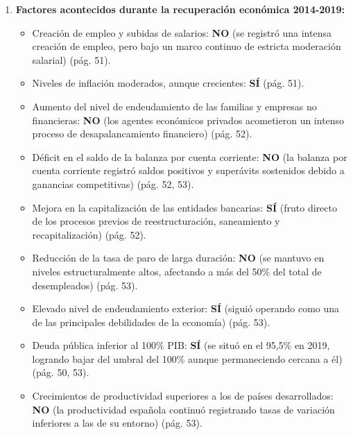 \begin{enumerate}[label=\arabic*.]
    \item \textbf{Factores acontecidos durante la recuperación económica 2014-2019:}
    \begin{itemize}
        \item Creación de empleo y subidas de salarios: \textbf{NO} (se registró una intensa creación de empleo, pero bajo un marco continuo de estricta moderación salarial) (pág. 51).
        \item Niveles de inflación moderados, aunque crecientes: \textbf{SÍ} (pág. 51).
        \item Aumento del nivel de endeudamiento de las familias y empresas no financieras: \textbf{NO} (los agentes económicos privados acometieron un intenso proceso de desapalancamiento financiero) (pág. 52).
        \item Déficit en el saldo de la balanza por cuenta corriente: \textbf{NO} (la balanza por cuenta corriente registró saldos positivos y superávits sostenidos debido a ganancias competitivas) (pág. 52, 53).
        \item Mejora en la capitalización de las entidades bancarias: \textbf{SÍ} (fruto directo de los procesos previos de reestructuración, saneamiento y recapitalización) (pág. 52).
        \item Reducción de la tasa de paro de larga duración: \textbf{NO} (se mantuvo en niveles estructuralmente altos, afectando a más del 50\% del total de desempleados) (pág. 53).
        \item Elevado nivel de endeudamiento exterior: \textbf{SÍ} (siguió operando como una de las principales debilidades de la economía) (pág. 53).
        \item Deuda pública inferior al 100\% PIB: \textbf{SÍ} (se situó en el 95,5\% en 2019, logrando bajar del umbral del 100\% aunque permaneciendo cercana a él) (pág. 50, 53).
        \item Crecimientos de productividad superiores a los de países desarrollados: \textbf{NO} (la productividad española continuó registrando tasas de variación inferiores a las de su entorno) (pág. 53).
    \end{itemize}


\end{enumerate}
